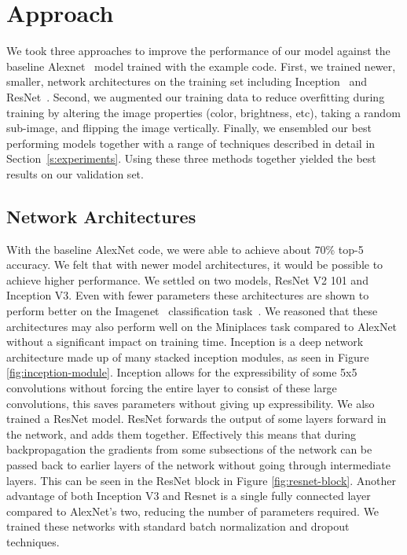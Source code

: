 \section{Approach}

We took three approaches to improve the performance of our model against the baseline Alexnet~\cite{alexnet} model trained with the example code. First, we trained newer, smaller, network architectures on the training set including Inception~\cite{inception} and ResNet~\cite{resnet}. Second, we augmented our training data to reduce overfitting during training by altering the image properties (color, brightness, etc), taking a random sub-image, and flipping the image vertically. Finally, we ensembled our best performing models together with a range of techniques described in detail in Section~\ref{s:experiments}. Using these three methods together yielded the best results on our validation set.

\subsection{Network Architectures}
With the baseline AlexNet code, we were able to achieve about 70\% top-5 accuracy. We felt that with newer model architectures, it would be possible to achieve higher performance. We settled on two models, ResNet V2 101 and Inception V3. Even with fewer parameters these architectures are shown to perform better on the Imagenet~\cite{imagenet} classification task~\cite{model-comparison}. We reasoned that these architectures may also perform well on the Miniplaces task compared to AlexNet without a significant impact on training time. Inception is a deep network architecture made up of many stacked inception modules, as seen in Figure \ref{fig:inception-module}. Inception allows for the expressibility of some 5x5 convolutions without forcing the entire layer to consist of these large convolutions, this saves parameters without giving up expressibility. We also trained a ResNet model. ResNet forwards the output of some layers forward in the network, and adds them together. Effectively this means that during backpropagation the gradients from some subsections of the network can be passed back to earlier layers of the network without going through intermediate layers. This can be seen in the ResNet block in Figure \ref{fig:resnet-block}. Another advantage of both Inception V3 and Resnet is a single fully connected layer compared to AlexNet's two, reducing the number of parameters required. We trained these networks with standard batch normalization and dropout techniques. 

